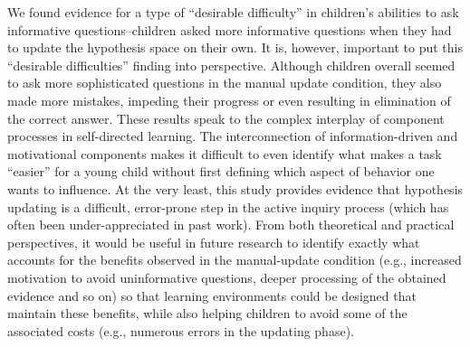 \documentclass[man,floatsintext]{apa6}
\begin{document}
We found evidence for a type of ``desirable difficulty'' in children's abilities to ask informative questions--children asked more informative questions when they had to update the hypothesis space on their own. It is, however, important to put this ``desirable difficulties'' finding into perspective.  Although children overall seemed to ask more sophisticated questions in the manual
update condition, they also made more mistakes, impeding their progress or even resulting in elimination of the correct answer.  These results
speak to the complex interplay of component processes in self-directed learning.  The interconnection of information-driven and motivational components
makes it difficult to even identify what makes a task ``easier'' for a young child without first defining which aspect of behavior one wants to influence.
At the very least, this study provides evidence that hypothesis updating is a difficult, error-prone step in the active inquiry process (which has often been under-appreciated in past work). From both theoretical and practical perspectives, it would be useful in future research to identify exactly what accounts for the benefits observed in the manual-update condition (e.g., increased motivation to avoid uninformative questions, deeper processing of the obtained evidence and so on) so that learning environments could be designed that maintain these benefits, while also helping children to avoid some of the associated costs (e.g., numerous errors in the updating phase).


\end{document}
